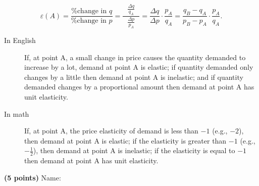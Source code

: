 \documentclass{article}
\begin{document}
\begin{EXAM}
\begin{itemize}
\[
\varepsilon (A)=\frac{\mbox{\% change in } q}{\mbox{\% change in } p} = \displaystyle\frac{\ \ \ \displaystyle\frac{\Delta q}{q_A}\ \ \ }{\displaystyle\frac{\Delta p}{p_A}} =
\frac{\Delta q}{\Delta p}\cdot\frac{p_A}{q_A} =
\frac{q_B-q_A}{p_B-p_A}\cdot\frac{p_A}{q_A}.
\]

\enlargethispage{2\baselineskip}

\begin{description}

\item [In English] If, at point A, a small change in price causes
the quantity demanded to increase by a lot, demand at point A is
elastic; if quantity demanded only changes by a little then demand
at point A is inelastic; and if quantity demanded changes by a
proportional amount then demand at point A has unit elasticity.

\item [In math] If, at point A, the price elasticity of demand is
less than $-1$ (e.g., $-2$), then demand at point A is elastic; if
the elasticity is greater than $-1$ (e.g., $-\frac{1}{2}$), then
demand at point A is inelastic; if the elasticity is equal to $-1$
then demand at point A has unit elasticity.

\end{description}


\end{itemize}

\clearpage


\vspace*{-3cm}

\begin{flushright}
\textbf{(5 points)} Name: \hspace*{1in}
\end{flushright}

\bigskip


\end{EXAM}
\end{document}
